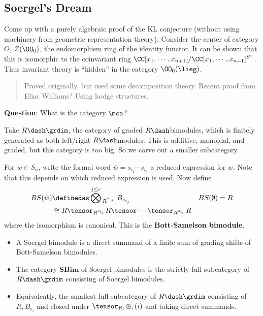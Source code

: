 \hypertarget{soergels-dream}{%
\subsection{Soergel's Dream}\label{soergels-dream}}

Come up with a purely algebraic proof of the KL conjecture (without
using machinery from geometric representation theory). Consider the
center of category \(O\), \(Z(\OO_0)\), the endomorphism ring of the
identity functor. It can be shown that this is isomorphic to the
coinvariant ring
\(\CC[x_1, \cdots, x_{n+1}] / \CC[x_1, \cdots, x_{n+1}]^{S^n}\). Thus
invariant theory is ``hidden'' in the category \(\OO_0(\lieg)\).

\begin{quote}
Proved originally, but used some decomposition theory. Recent proof from
Elias Williams? Using hodge structures.
\end{quote}

\textbf{Question}: What is the category \(\mca\)?

\begin{definition}

Take \(R\dash\grdim\), the category of graded \(R\dash\)bimodules, which
is finitely generated as both left/right \(R\dash\)modules. This is
additive, monoidal, and graded, but this category is too big. So we
carve out a smaller subcategory.

For \(w\in S_n\), write the formal word
\(\bar w = s_{i_1} \cdots s_{i_r}\) a reduced expression for \(w\). Note
that this depends on which reduced expression is used. Now define
\begin{align*}
BS(\bar w) 
&\definedas \bigotimes^{j\leq r}{}_{R^{s_{i_j}}} \,\,B_{s_{i_j}}  && BS(\emptyset) = R \\
&\cong R \tensor_{R^{s_{i_1}}} R \tensor \cdots \tensor_{R^{s_{i_r}}} R
\end{align*} where the isomorphism is canonical. This is the
\textbf{Bott-Samelson bimodule}.

\end{definition}

\begin{definition}[?]

\hfill

\begin{itemize}
\tightlist
\item
  A Soergel bimodule is a direct summand of a finite sum of grading
  shifts of Bott-Samelson bimodules.
\item
  The category \(\mathbf{SBim}\) of Soergel bimodules is the strictly
  full subcategory of \(R\dash\grdim\) consisting of Soergel bimodules.
\item
  Equivalently, the smallest full subcategory of \(R\dash\grdim\)
  consisting of \(R, B_{s_i}\) and closed under
  \(\tensor_R, \oplus, (i)\) and taking direct summands.
\end{itemize}

\end{definition}

